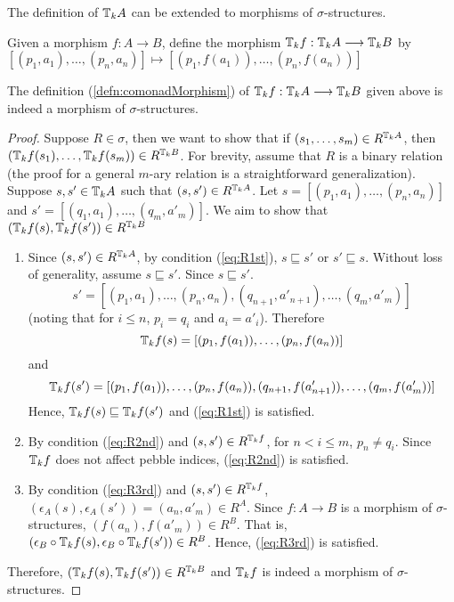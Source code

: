 The definition of ${\mathbb{T}_{k}A}$ can be extended to morphisms of $\sigma$-structures. 
\begin{defn}
Given a morphism $f:A \longrightarrow B$, define the morphism ${\mathbb{T}_{k}f}:{\mathbb{T}_{k}A} \longrightarrow {\mathbb{T}_{k}B}$ by $[(p_{1},a_{1}),\dots,(p_{n},a_{n})] \mapsto [(p_{1},f(a_{1})),\dots,(p_{n},f(a_{n}))]$
\label{defn:comonadMorphism}
\end{defn}
\begin{prop}
The definition (\ref{defn:comonadMorphism}) of ${\mathbb{T}_{k}f}:{\mathbb{T}_{k}A} \longrightarrow {\mathbb{T}_{k}B}$ given above is indeed a morphism of $\sigma$-structures. 
\begin{proof}
Suppose $R \in \sigma$, then we want to show that if $(s_{1},\dots,s_{m}) \in R^{{\mathbb{T}_{k}A}}$, then \linebreak $({\mathbb{T}_{k}f}(s_{1}),\dots,{\mathbb{T}_{k}f}(s_{m})) \in R^{{\mathbb{T}_{k}B}}$. For brevity, assume that $R$ is a binary relation (the proof for a general $m$-ary relation is a straightforward generalization). Suppose $s,s' \in {\mathbb{T}_{k}A}$ such that $(s,s') \in R^{{\mathbb{T}_{k}A}}$. Let $s = [(p_{1},a_{1}),\dots,(p_{n},a_{n})]$ and $s' = [(q_{1},a_{1}),\dots,(q_{m},a'_{m})]$. We aim to show that $({\mathbb{T}_{k}f}(s),{\mathbb{T}_{k}f}(s')) \in R^{{\mathbb{T}_{k}B}}$ \\
\begin{enumerate}
\item  Since $(s,s') \in R^{{\mathbb{T}_{k}A}}$, by condition (\ref{eq:R1st}), $s \sqsubseteq s'$ or $s' \sqsubseteq s$. Without loss of generality, assume $s \sqsubseteq s'$. Since $s \sqsubseteq s'$.
$$s' = [(p_{1},a_{1}),\dots,(p_{n},a_{n}),(q_{n+1},a'_{n+1}),\dots,(q_{m},a'_{m})]$$ 
(noting that for $i \leq n$, $p_{i} = q_{i}$ and $a_{i} = a'_{i}$). Therefore $${\mathbb{T}_{k}f}(s) = [(p_{1},f(a_{1})),\dots,(p_{n},f(a_{n}))]$$ 
and 
$${\mathbb{T}_{k}f}(s') =[(p_{1},f(a_{1})),\dots,(p_{n},f(a_{n})),(q_{n+1},f(a'_{n+1})), \dots,(q_{m},f(a'_{m}))]$$ 
Hence, ${\mathbb{T}_{k}f}(s) \sqsubseteq {\mathbb{T}_{k}f}(s')$ and (\ref{eq:R1st}) is satisfied. 
\item By condition (\ref{eq:R2nd}) and $(s,s') \in R^{{\mathbb{T}_{k}f}}$, for $n < i \leq m$, $p_{n} \not= q_{i}$. Since ${\mathbb{T}_{k}f}$ does not affect pebble indices, (\ref{eq:R2nd}) is satisfied.
\item  By condition (\ref{eq:R3rd}) and $(s,s') \in R^{{\mathbb{T}_{k}f}}$, $(\epsilon_{A}(s),\epsilon_{A}(s')) = (a_{n},a'_{m}) \in R^{A}$. Since $f:A \rightarrow B$ is a morphism of $\sigma$-structures, $(f(a_{n}),f(a'_{m})) \in R^{B}$. That is, $(\epsilon_{B}\circ {\mathbb{T}_{k}f}(s),\epsilon_{B} \circ {\mathbb{T}_{k}f}(s')) \in R^{B}$. Hence, (\ref{eq:R3rd}) is satisfied.
\end{enumerate}
Therefore, $({\mathbb{T}_{k}f}(s),{\mathbb{T}_{k}f}(s')) \in R^{{\mathbb{T}_{k}B}}$ and ${\mathbb{T}_{k}f}$ is indeed a morphism of $\sigma$-structures. 
\end{proof}
\end{prop}
